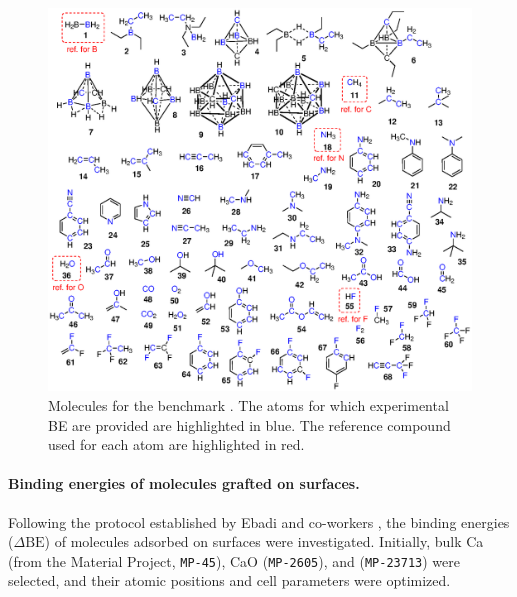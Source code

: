 \documentclass[12pt,a4paper]{article}
\def\dbe{\ensuremath{\Delta\text{BE}}}
\begin{document}
\begin{figure}[!h]
	\centering
	\includegraphics[width=\linewidth]{Figure3}
	\caption{Molecules for the benchmark \cite{pueyobellafontPredictingCoreLevel2017}. The atoms for which experimental BE are provided are highlighted in blue.  The reference compound used for each atom are highlighted in red.}
	\label{fig:core185}
\end{figure}

\paragraph{Binding energies of molecules grafted on surfaces.} Following the protocol established by Ebadi and co-workers \cite{ebadiInsightsLiMetalOrganic2019}, the binding energies (\dbe{}) of molecules adsorbed on surfaces were investigated. Initially, bulk Ca (from the Material Project, \texttt{MP-45}), CaO (\texttt{MP-2605}), and  (\texttt{MP-23713}) were selected, and their atomic positions and cell parameters were optimized.
\end{document}
